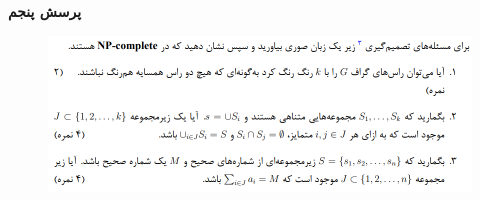 \textbf{پرسش پنجم}

\begin{figure}[H]
    \centering
    \includegraphics[scale=0.87]{questions/5.png}
\end{figure}